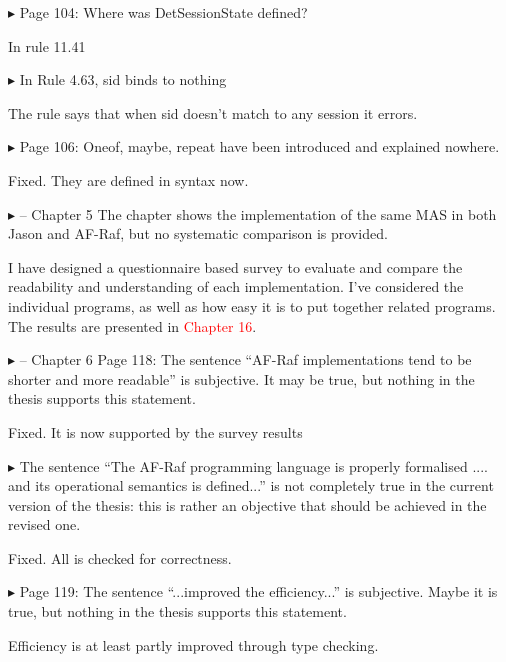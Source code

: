 \documentclass{article}
\newcommand*\R[1]{\textcolor{red}{#1}} %
\newenvironment{them}%
  {\bigskip\noindent\begingroup\color{blue}$\blacktriangleright$\enspace}%
  {\endgroup\par}
\begin{document}
\begin{them}
Page 104:
Where was DetSessionState defined?
\end{them}
In rule 11.41

\begin{them}
In Rule 4.63, sid binds to nothing
\end{them}
The rule says that when sid doesn't match to any session it errors.

\begin{them}
Page 106:
Oneof, maybe, repeat have been introduced and explained nowhere.
\end{them}
Fixed. They are defined in syntax now.

\begin{them}
-- Chapter 5
The chapter shows the implementation of the same MAS in both Jason and AF-Raf,
but no systematic comparison is provided.
\end{them}
I have designed a questionnaire based survey to evaluate and compare the
readability and understanding of each implementation. I've considered the
individual programs, as well as how easy it is to put together related
programs. The results are presented in \R{Chapter 16}.

\begin{them}
-- Chapter 6
Page 118:
The sentence ``AF-Raf implementations tend to be shorter and more readable'' is
subjective. It may be true, but nothing in the thesis supports this statement.
\end{them}
Fixed. It is now supported by the survey results

\begin{them}
The sentence ``The AF-Raf programming language is properly formalised .... and
its operational semantics is defined...'' is not completely true in the current
version of the thesis: this is rather an objective that should be achieved in
the revised one.
\end{them}
Fixed. All is checked for correctness.

\begin{them}
Page 119:
The sentence ``...improved the efficiency...'' is subjective. Maybe it is true,
but nothing in the thesis supports this statement.
\end{them}
Efficiency is at least partly improved through type checking.
\end{document}

